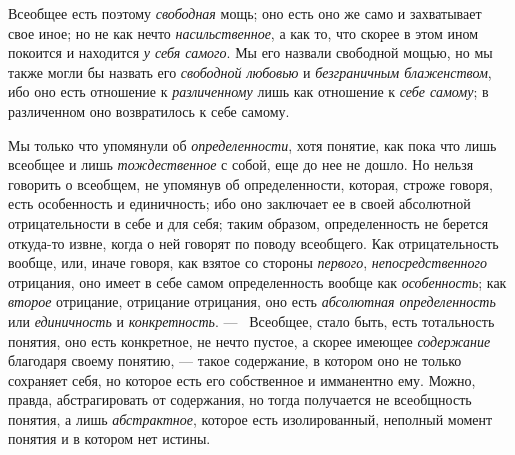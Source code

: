 \documentclass[twoside]{article}
\begin{document}
{{Всеобщее есть поэтому
{\em свободная} мощь; оно
есть оно же само и захватывает свое иное; но не как нечто
{\em насильственное}, а
как то, что скорее в этом ином покоится и находится
{\em у себя самого}. Мы
его назвали свободной мощью, но мы также могли бы назвать его
{\em свободной любовью} и
{\em безграничным блаженством},
ибо оно есть отношение к
{\em различенному} лишь
как отношение к {\em себе самому};
в различенном оно возвратилось к себе самому.

Мы только что упомянули об
{\em определенности},
хотя понятие, как пока что лишь всеобщее и лишь
{\em тождественное} с
собой, еще до нее не дошло. Но нельзя говорить о всеобщем, не упомянув об
определенности, которая, строже говоря, есть особенность и единичность; ибо
оно заключает ее в своей абсолютной отрицательности в себе и для себя;
таким образом, определенность не берется откуда-то извне, когда о ней
говорят по поводу всеобщего. Как отрицательность вообще, или, иначе говоря,
как взятое со стороны {\em первого},
{\em непосредственного}
отрицания, оно имеет в себе самом
определенность вообще как
{\em особенность}; как
{\em второе} отрицание,
отрицание отрицания, оно есть
{\em абсолютная определенность}
или {\em единичность}
и {\em конкретность}. —
\ Всеобщее, стало быть, есть тотальность понятия, оно есть
конкретное, не нечто пустое, а скорее имеющее
{\em содержание}
благодаря своему понятию, — такое содержание,
в котором оно не только сохраняет себя, но которое есть его собственное и
имманентно ему. Можно, правда, абстрагировать от содержания, но тогда
получается не всеобщность понятия, а лишь
{\em абстрактное},
которое есть изолированный, неполный момент понятия и в
котором нет истины.

}}
\end{document}
